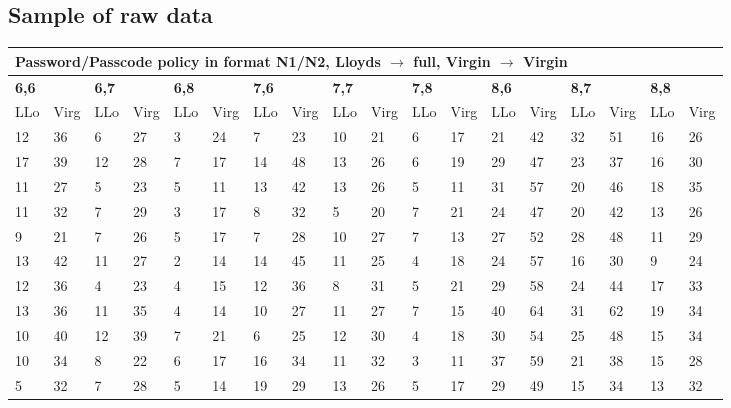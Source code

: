 \documentclass[british,11pt,a4paper]{article}
\begin{document}
\begin{appendices}
	\subsection{Sample of raw data}
	\label{app:raw_data}
	\begin{longtable}{|p{0.5cm}|p{0.5cm}|p{0.5cm}|p{0.5cm}|p{0.5cm}|p{0.5cm}|p{0.5cm}|p{0.5cm}|p{0.5cm}|p{0.5cm}|p{0.5cm}|p{0.5cm}|p{0.5cm}|p{0.5cm}|p{0.5cm}|p{0.5cm}|p{0.5cm}|p{0.5cm}|}
	\hline
	\multicolumn{18}{|l|}{\textbf{Password/Passcode policy in format N1/N2, Lloyds $\rightarrow$ full, Virgin $\rightarrow$ Virgin}} \\ \hline
	\multicolumn{2}{|l|}{\textbf{6,6}} & \multicolumn{2}{l|}{\textbf{6,7}} & \multicolumn{2}{l|}{\textbf{6,8}} & \multicolumn{2}{l|}{\textbf{7,6}} & \multicolumn{2}{l|}{\textbf{7,7}} & \multicolumn{2}{l|}{\textbf{7,8}} & \multicolumn{2}{l|}{\textbf{8,6}} & \multicolumn{2}{l|}{\textbf{8,7}} & \multicolumn{2}{l|}{\textbf{8,8}} \\ \hline
	LLo & Virg & LLo & Virg & LLo & Virg & LLo & Virg & LLo & Virg & LLo & Virg & LLo & Virg & LLo & Virg & LLo & Virg \\ \hline
	12 & 36 & 6 & 27 & 3 & 24 & 7 & 23 & 10 & 21 & 6 & 17 & 21 & 42 & 32 & 51 & 16 & 26 \\ \hline
	17 & 39 & 12 & 28 & 7 & 17 & 14 & 48 & 13 & 26 & 6 & 19 & 29 & 47 & 23 & 37 & 16 & 30 \\ \hline
	11 & 27 & 5 & 23 & 5 & 11 & 13 & 42 & 13 & 26 & 5 & 11 & 31 & 57 & 20 & 46 & 18 & 35 \\ \hline
	11 & 32 & 7 & 29 & 3 & 17 & 8 & 32 & 5 & 20 & 7 & 21 & 24 & 47 & 20 & 42 & 13 & 26 \\ \hline
	9 & 21 & 7 & 26 & 5 & 17 & 7 & 28 & 10 & 27 & 7 & 13 & 27 & 52 & 28 & 48 & 11 & 29 \\ \hline
	13 & 42 & 11 & 27 & 2 & 14 & 14 & 45 & 11 & 25 & 4 & 18 & 24 & 57 & 16 & 30 & 9 & 24 \\ \hline
	12 & 36 & 4 & 23 & 4 & 15 & 12 & 36 & 8 & 31 & 5 & 21 & 29 & 58 & 24 & 44 & 17 & 33 \\ \hline
	13 & 36 & 11 & 35 & 4 & 14 & 10 & 27 & 11 & 27 & 7 & 15 & 40 & 64 & 31 & 62 & 19 & 34 \\ \hline
	10 & 40 & 12 & 39 & 7 & 21 & 6 & 25 & 12 & 30 & 4 & 18 & 30 & 54 & 25 & 48 & 15 & 34 \\ \hline
	10 & 34 & 8 & 22 & 6 & 17 & 16 & 34 & 11 & 32 & 3 & 11 & 37 & 59 & 21 & 38 & 15 & 28 \\ \hline
	5 & 32 & 7 & 28 & 5 & 14 & 19 & 29 & 13 & 26 & 5 & 17 & 29 & 49 & 15 & 34 & 13 & 32 \\ \hline

\end{longtable}
\end{appendices}
\end{document}
